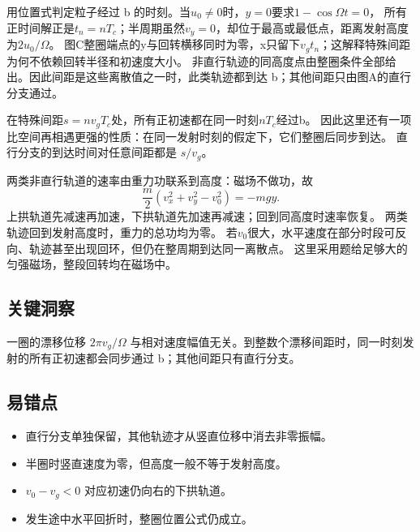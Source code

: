 \documentclass[UTF8,fontset=fandol,a4paper,11pt]{ctexart}
\begin{document}
用位置式判定粒子经过 b 的时刻。当$u_0\ne0$时，$y=0$要求$1-\cos\Omega t=0$，
所有正时间解正是$t_n=nT_c$；半周期虽然$v_y=0$，却位于最高或最低点，距离发射高度为$2u_0/\Omega$。
图C整圈端点的y与回转横移同时为零，x只留下$v_gt_n$；这解释特殊间距为何不依赖回转半径和初速度大小。
非直行轨迹的同高度点由整圈条件全部给出。因此间距是这些离散值之一时，此类轨迹都到达 b；其他间距只由图A的直行分支通过。

在特殊间距$s=n v_gT_c$处，所有正初速都在同一时刻$nT_c$经过b。
因此这里还有一项比空间再相遇更强的性质：在同一发射时刻的假定下，它们整圈后同步到达。
直行分支的到达时间对任意间距都是 $s/v_g$。

两类非直行轨道的速率由重力功联系到高度：磁场不做功，故
\[
\frac m2(v_x^2+v_y^2-v_0^2)=-mgy.
\]
上拱轨道先减速再加速，下拱轨道先加速再减速；回到同高度时速率恢复。
两类轨迹回到发射高度时，重力的总功均为零。
若$v_0$很大，水平速度在部分时段可反向、轨迹甚至出现回环，但仍在整周期到达同一离散点。
这里采用题给足够大的匀强磁场，整段回转均在磁场中。




\subsection*{关键洞察}

一圈的漂移位移 $2\pi v_g/\Omega$ 与相对速度幅值无关。到整数个漂移间距时，同一时刻发射的所有正初速都会同步通过 b；其他间距只有直行分支。



\subsection*{易错点}

\begin{itemize}
\item 直行分支单独保留，其他轨迹才从竖直位移中消去非零振幅。
\item 半圈时竖直速度为零，但高度一般不等于发射高度。
\item $v_0-v_g<0$ 对应初速仍向右的下拱轨道。
\item 发生途中水平回折时，整圈位置公式仍成立。
\end{itemize}


\end{document}
